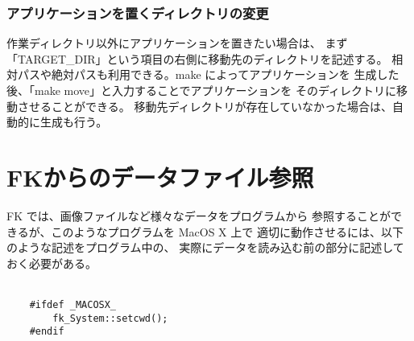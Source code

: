 \documentclass[a4j]{jarticle}
\begin{document}
\subsubsection*{アプリケーションを置くディレクトリの変更}
作業ディレクトリ以外にアプリケーションを置きたい場合は、
まず「TARGET\_DIR」という項目の右側に移動先のディレクトリを記述する。
相対パスや絶対パスも利用できる。make によってアプリケーションを
生成した後、「make move」と入力することでアプリケーションを
そのディレクトリに移動させることができる。
移動先ディレクトリが存在していなかった場合は、自動的に生成も行う。

\section{FKからのデータファイル参照}
FK では、画像ファイルなど様々なデータをプログラムから
参照することができるが、このようなプログラムを MacOS X 上で
適切に動作させるには、以下のような記述をプログラム中の、
実際にデータを読み込む前の部分に記述しておく必要がある。\\ ~ \\
\begin{screen}
\begin{verbatim}
    #ifdef _MACOSX_
        fk_System::setcwd();
    #endif
\end{verbatim}
\end{screen}
\end{document}
